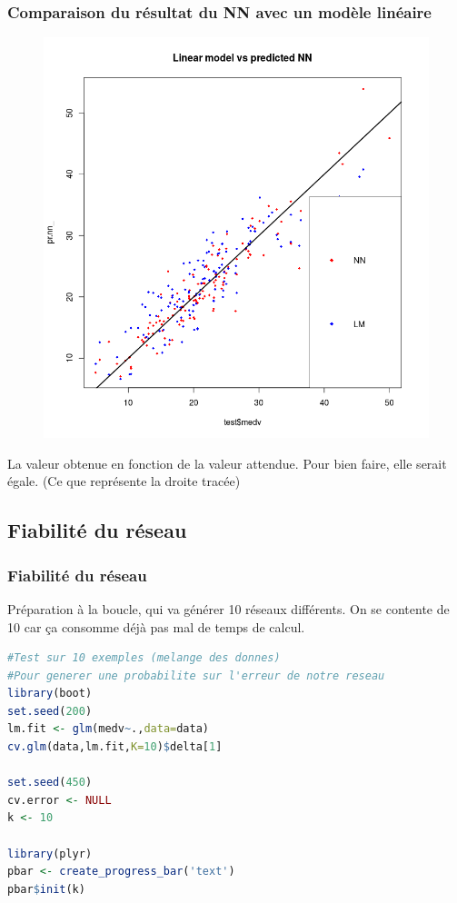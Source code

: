 \documentclass[compress]{beamer}
\begin{document}
\begin{frame}
	\frametitle{Comparaison du résultat du NN avec un modèle linéaire}
		\begin{figure}
			\vspace{-7em}
			\includegraphics[width=\linewidth]{img/nn_lm}
		\end{figure}
		La valeur obtenue en fonction de la valeur attendue. Pour bien faire, elle serait égale. (Ce que représente la droite tracée)
\end{frame}

		
\subsection{Fiabilité du réseau}
\begin{frame}[fragile]
	\frametitle{Fiabilité du réseau}
	Préparation à la boucle, qui va générer 10 réseaux différents. On se contente de 10 car ça consomme déjà pas mal de temps de calcul.
\begin{lstlisting}[language=R]
#Test sur 10 exemples (melange des donnes)
#Pour generer une probabilite sur l'erreur de notre reseau
library(boot)
set.seed(200)
lm.fit <- glm(medv~.,data=data)
cv.glm(data,lm.fit,K=10)$delta[1]
	
set.seed(450)
cv.error <- NULL
k <- 10
	
library(plyr) 
pbar <- create_progress_bar('text')
pbar$init(k)
\end{lstlisting}
\end{frame}
\end{document}

